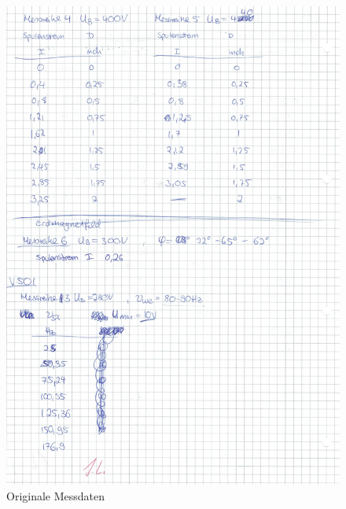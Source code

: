 \begin{figure}
  \centering
  \includegraphics[width=\textwidth]{OMD2.pdf}
  \caption{Originale Messdaten}
  \label{OMD2}
\end{figure}
